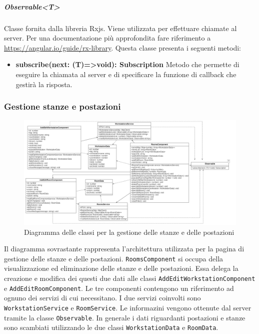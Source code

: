 \subparagraph{Observable<T>}
Classe fornita dalla libreria Rxjs. Viene utilizzata per effettuare chiamate  al server. Per una documentazione più approfondita fare riferimento a \url{https://angular.io/guide/rx-library}. \newline
Questa classe presenta i seguenti metodi:
\begin{itemize}
	\item \textbf{subscribe(next: (T)=>void): Subscription} \newline
	Metodo che permette di eseguire la chiamata al server e di specificare la funzione di callback che gestirà la risposta.
\end{itemize}

\subsubsection{Gestione stanze e postazioni}
\begin{figure}[H]
	\centering
	\includegraphics[width=18cm]{res/images/webapp-visualAddEditStanzePostazioni-diagrammaClassi.png}
	\caption{Diagramma delle classi per la gestione delle stanze e delle postazioni}
	\label{fig:DiagrammaClassiStanzePostazioni}
\end{figure}
Il diagramma sovrastante rappresenta l'architettura utilizzata per la pagina di gestione delle stanze e delle postazioni. \newline
\texttt{RoomsComponent} si occupa della visualizzazione ed eliminazione delle stanze e delle postazioni. Essa delega la creazione e modifica dei questi due dati alle classi \texttt{AddEditWorkstationComponent} e \texttt{AddEditRoomComponent}. Le tre componenti contengono un riferimento ad ognuno dei servizi di cui necessitano. I due servizi coinvolti sono \texttt{WorkstationService} e \texttt{RoomService}. Le informazini vengono ottenute dal server tramite la classe \texttt{Observable}. In generale i dati riguardanti postazioni e stanze sono scambiati utilizzando le due classi \texttt{WorkstationData} e \texttt{RoomData}.


